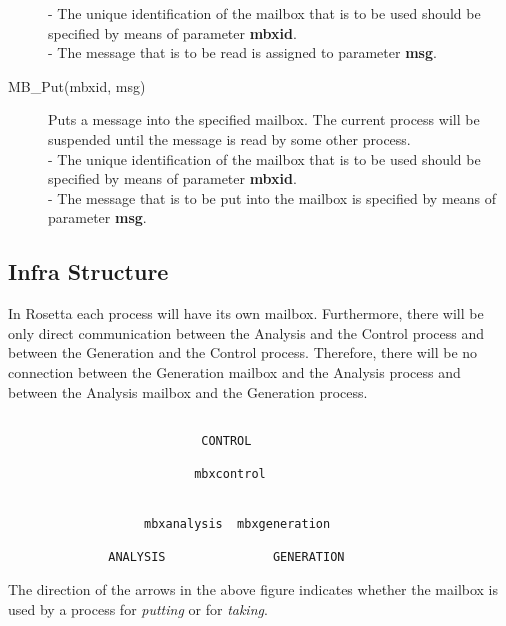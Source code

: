 \begin{description}
        - The unique identification of the mailbox that is to be used should
        be specified by means of parameter {\bf mbxid}. \\
        - The message that is to be read is assigned to parameter {\bf msg}.
\item[MB\_Put(mbxid, msg)] Puts a message into the 
        specified mailbox. The current
        process will be suspended until the message is read by some other 
        process.\\
        - The unique identification of the mailbox that is to be used should
        be specified by means of parameter {\bf mbxid}. \\
        - The message that is to be put into the mailbox is specified by means
        of parameter {\bf msg}.
\end{description}
\subsection{Infra Structure}
In Rosetta each process will have its own mailbox. Furthermore, there will be 
only direct communication between the Analysis and the Control process and 
between the Generation and the Control process. Therefore, there will be no
connection between the Generation mailbox and the Analysis process and between
the Analysis mailbox and the Generation process.
\begin{verbatim}

                           CONTROL

                          mbxcontrol


                   mbxanalysis  mbxgeneration

              ANALYSIS               GENERATION
\end{verbatim}
The direction of the arrows in the above figure indicates whether the mailbox
is used by a process for {\em putting} or for {\em taking}.

